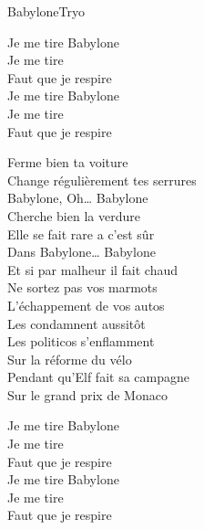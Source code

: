 \begin{Song}{Babylone}{Tryo}
\begin{multicols}{2}
\begin{Chorus}
Je me tire  Babylone\\
Je me tire \\
Faut que je respire\\
Je me tire  Babylone\\
Je me tire \\
Faut que je respire\\
\end{Chorus}
\columnbreak

\begin{Verse}
Ferme bien ta voiture\\
Change régulièrement tes serrures\\
Babylone, Oh… Babylone\\
Cherche bien la verdure \\
Elle se fait rare a c'est sûr\\
Dans Babylone… Babylone\\
Et si par malheur il fait chaud \\
Ne sortez pas vos marmots\\
L'échappement de vos autos\\
Les condamnent aussitôt\\
Les politicos s'enflamment\\
Sur la réforme du vélo\\
Pendant qu'Elf fait sa campagne\\
Sur le grand prix de Monaco\\
\end{Verse}
\espaceInterStrophe

\begin{Chorus}
Je me tire  Babylone\\
Je me tire \\
Faut que je respire\\
Je me tire  Babylone\\
Je me tire \\
Faut que je respire\\
\end{Chorus}
\espaceInterStrophe

\\
\espaceInterStrophe


\end{multicols}
\end{Song}
